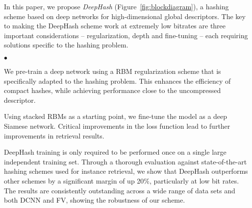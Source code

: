 \documentclass[10pt,twocolumn,letterpaper]{article}
\newcommand{\squishlist}{
 \begin{list}{$\bullet$}
  { \setlength{\itemsep}{0pt}
     \setlength{\parsep}{3pt}
     \setlength{\topsep}{3pt}
     \setlength{\partopsep}{0pt}
     \setlength{\leftmargin}{1.5em}
     \setlength{\labelwidth}{1em}
     \setlength{\labelsep}{0.5em}}}
\newcommand{\squishend}{
  \end{list}  }
\begin{document}
In this paper, we propose {\it DeepHash} (Figure~\ref{fig:blockdiagram}), a hashing scheme based on deep networks for high-dimensional global descriptors. The key to making the DeepHash scheme work at extremely low bitrates are three important considerations -- regularization, depth and fine-tuning -- each requiring solutions specific to the hashing problem.

\squishlist
\item 
We pre-train a deep network using a RBM regularization scheme that is specifically adapted to the hashing problem. This enhances the efficiency of compact hashes, while achieving performance close to the uncompressed descriptor.

\item 
Using stacked RBMs as a starting point, we fine-tune the model as a deep Siamese network. 
Critical improvements in the loss function lead to further improvements in retrieval results.

\item 
DeepHash training is only required to be performed once on a single large independent training set. Through a thorough evaluation against state-of-the-art hashing schemes used for instance retrieval, we show that DeepHash outperforms other schemes by a significant margin of up 20$\%$, particularly at low bit rates. The results are consistently outstanding across a wide range of data sets and both DCNN and FV, showing the robustness of our scheme.
\squishend
\end{document}
